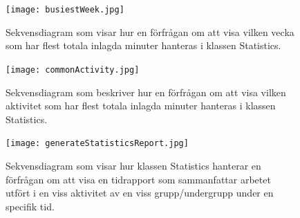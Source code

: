 \documentclass[a4paper]{article}
\begin{document}
\begin{figure}[h!]
\centering
\texttt{[image: busiestWeek.jpg]}
\caption{Sekvensdiagram som visar hur en förfrågan om att visa vilken vecka som har flest totala inlagda minuter hanteras i klassen Statistics.
\label{busiestWeek}}
\end{figure}

\begin{figure}[h!]
\centering
\texttt{[image: commonActivity.jpg]}
\caption{Sekvensdiagram som beskriver hur en förfrågan om att visa vilken aktivitet som har flest totala inlagda minuter hanteras i klassen Statistics.
\label{commonActivity}}
\end{figure}

\begin{figure}[h!]
\centering
\texttt{[image: generateStatisticsReport.jpg]}
\caption{Sekvensdiagram som visar hur klassen Statistics hanterar en förfrågan om att visa en tidrapport som sammanfattar arbetet utfört i en viss aktivitet av en viss grupp/undergrupp under en specifik tid.
\label{generateStatisticsReport}}
\end{figure}
\end{document}
